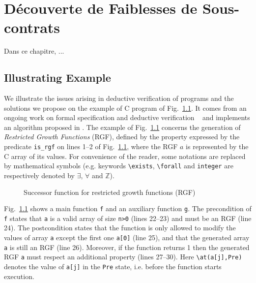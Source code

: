 
\chapter{Découverte de Faiblesses de Sous-contrats}
\label{sec:swd}

\chapterintro

Dans ce chapitre, ...



\section{Illustrating Example}
\label{subsec:example}

We illustrate the issues arising in deductive verification of programs and the
solutions we propose on the example of C program of
Fig.~\ref{fig:rgf1}. It comes from an ongoing work on formal specification and
deductive verification
~\cite{Genestier/TAP15}
and implements an
algorithm proposed in \cite[page 235]{Arndt/10}.
The example of Fig.~\ref{fig:rgf1} 
concerns the generation of
\emph{Restricted Growth Functions} (RGF),
defined by the property expressed by the \acsl
predicate \lstinline{is_rgf} on lines 1--2 of Fig.~\ref{fig:rgf1}, where the RGF
$a$ is represented by the C array
of its values. 
For convenience of the reader, 
some \acsl notations are  replaced by mathematical symbols
(e.g. keywords \lstinline[style=c]{\exists}, \lstinline[style=c]{\forall} and
\lstinline[style=c]{integer} are respectively denoted by $\exists$, $\forall$ and $\mathbb{Z}$).


\begin{figure}[tb]
  \centering
  
  \caption{Successor function for restricted growth functions (RGF)\label{fig:rgf1}}
  \vspace{-5mm}
\end{figure}


Fig.~\ref{fig:rgf1} shows a main function \lstinline{f} 
and an auxiliary function \lstinline{g}.
The precondition of \lstinline{f} states that \lstinline{a} is a valid array 
of size  \lstinline{n>0} (lines 22--23) and must be an RGF (line 24).
The postcondition states 
that the function is only allowed to modify the values of array \lstinline{a} except
the first one \lstinline{a[0]} (line 25), 
and that the generated array \lstinline{a} is still an RGF (line 26).
Moreover, if the function returns 1 then the generated RGF \lstinline{a} must
respect an additional property
(lines 27--30).
Here \lstinline{\at(a[j],Pre)} denotes the value of \lstinline{a[j]} in the 
\lstinline{Pre} state, i.e. before the function starts execution.


